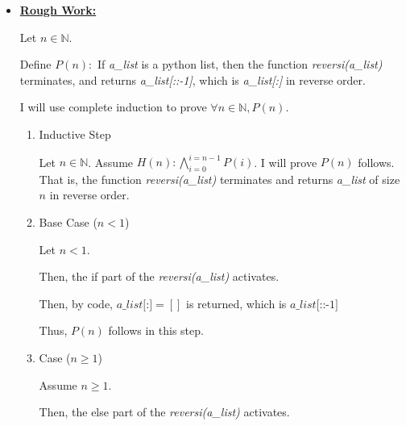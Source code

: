 \documentclass[12pt]{article}
\begin{document}
\begin{itemize}
    \item

    \begin{mdframed}
    \underline{\textbf{Rough Work:}}

    \bigskip

    Let $n \in \mathbb{N}$.

    \bigskip

    Define $P(n):$ If \textit{a\_list} is a python list, then the function
    \textit{reversi(a\_list)} terminates, and returns \textit{a\_list[::-1]},
    which is \textit{a\_list[:]} in reverse order.

    \bigskip

    I will use complete induction to prove $\forall n \in \mathbb{N}, P(n)$.

    \begin{enumerate}[1.]
        \item Inductive Step

        \begin{mdframed}
        Let $n \in \mathbb{N}$. Assume $H(n): \bigwedge\limits_{i=0}^{i=n-1} P(i)$.
        I will prove $P(n)$ follows. That is, the function \textit{reversi(a\_list)} terminates
        and returns \textit{a\_list} of size $n$ in reverse order.
        \end{mdframed}

        \item Base Case ($n < 1$)

        \begin{mdframed}
        Let $n < 1$.

        \bigskip

        Then, the if part of the \textit{reversi(a\_list)} activates.

        \bigskip

        Then, by code, $\textit{a\_list[:]} = []$ is returned, which is $\textit{a\_list[::-1]}$

        \bigskip

        Thus, $P(n)$ follows in this step.
        \end{mdframed}

        \item Case ($n \geq 1$)

        \begin{mdframed}
        Assume $n \geq 1$.

        \bigskip

        Then, the else part of the \textit{reversi(a\_list)} activates.


\end{mdframed}
\end{enumerate}
\end{mdframed}
\end{itemize}
\end{document}
